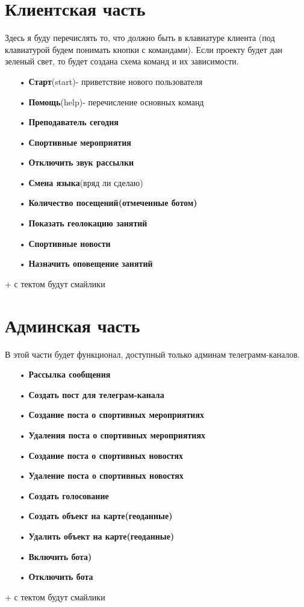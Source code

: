  \section{Клиентская часть}
 Здесь я буду перечислять то, что должно быть в клавиатуре клиента (под клавиатурой будем понимать кнопки с командами). Если проекту будет дан зеленый свет, то будет создана схема команд и их зависимости.
  \begin{enumerate}
 \item[•] \textbf{Старт}(start)- приветствие нового пользователя
 \item[•] \textbf{Помощь}(help)- перечисление основных команд
 \item[•] \textbf{Преподаватель сегодня}
 \item[•] \textbf{Спортивные мероприятия}
 \item[•] \textbf{Отключить звук рассылки}
 \item[•] \textbf{Смена языка}(вряд ли сделаю)
 \item[•] \textbf{Количество посещений(отмеченные ботом)}
 \item[•] \textbf{Показать геолокацию занятий}
 \item[•] \textbf{Спортивные новости}
 \item[•] \textbf{Назначить оповещение занятий}
  \end{enumerate}
 + с тектом будут смайлики
  \section{Админская часть}
  В этой части будет функционал, доступный только админам телеграмм-каналов.
    \begin{enumerate}
   \item[•] \textbf{Рассылка сообщения}
    \item[•] \textbf{Создать пост для телеграм-канала}
    \item[•] \textbf{Создание поста о спортивных мероприятиях}
    \item[•] \textbf{Удаления поста о спортивных мероприятиях}
    \item[•] \textbf{Создание поста о спортивных новостях}
    \item[•] \textbf{Удаление поста о спортивных новостях}
    \item[•] \textbf{Создать голосование}
    \item[•] \textbf{Создать объект на карте(геоданные)}
    \item[•] \textbf{Удалить объект на карте(геоданные)}
    \item[•] \textbf{Включить бота)}
    \item[•] \textbf{Отключить бота}
    
	 \end{enumerate}
	  + с тектом будут смайлики
